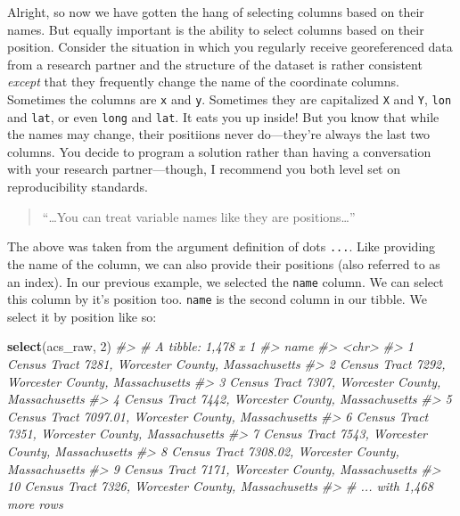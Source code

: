 \documentclass[
]{book}
\newenvironment{Shaded}{\begin{snugshade}}{\end{snugshade}}
\newcommand{\CommentTok}[1]{\textcolor[rgb]{0.56,0.35,0.01}{\textit{#1}}}
\newcommand{\DecValTok}[1]{\textcolor[rgb]{0.00,0.00,0.81}{#1}}
\newcommand{\KeywordTok}[1]{\textcolor[rgb]{0.13,0.29,0.53}{\textbf{#1}}}
\newcommand{\NormalTok}[1]{#1}
\begin{document}
Alright, so now we have gotten the hang of selecting columns based on their names. But equally important is the ability to select columns based on their position. Consider the situation in which you regularly receive georeferenced data from a research partner and the structure of the dataset is rather consistent \emph{except} that they frequently change the name of the coordinate columns. Sometimes the columns are \texttt{x} and \texttt{y}. Sometimes they are capitalized \texttt{X} and \texttt{Y}, \texttt{lon} and \texttt{lat}, or even \texttt{long} and \texttt{lat}. It eats you up inside! But you know that while the names may change, their positiions never do---they're always the last two columns. You decide to program a solution rather than having a conversation with your research partner---though, I recommend you both level set on reproducibility standards.

\begin{quote}
``\ldots You can treat variable names like they are positions\ldots{}''
\end{quote}

The above was taken from the argument definition of dots \texttt{...}. Like providing the name of the column, we can also provide their positions (also referred to as an index). In our previous example, we selected the \texttt{name} column. We can select this column by it's position too. \texttt{name} is the second column in our tibble. We select it by position like so:

\begin{Shaded}
\begin{Highlighting}[]
\KeywordTok{select}\NormalTok{(acs\_raw, }\DecValTok{2}\NormalTok{)}
\CommentTok{\#\textgreater{} \# A tibble: 1,478 x 1}
\CommentTok{\#\textgreater{}    name                                                 }
\CommentTok{\#\textgreater{}    \textless{}chr\textgreater{}                                                }
\CommentTok{\#\textgreater{}  1 Census Tract 7281, Worcester County, Massachusetts   }
\CommentTok{\#\textgreater{}  2 Census Tract 7292, Worcester County, Massachusetts   }
\CommentTok{\#\textgreater{}  3 Census Tract 7307, Worcester County, Massachusetts   }
\CommentTok{\#\textgreater{}  4 Census Tract 7442, Worcester County, Massachusetts   }
\CommentTok{\#\textgreater{}  5 Census Tract 7097.01, Worcester County, Massachusetts}
\CommentTok{\#\textgreater{}  6 Census Tract 7351, Worcester County, Massachusetts   }
\CommentTok{\#\textgreater{}  7 Census Tract 7543, Worcester County, Massachusetts   }
\CommentTok{\#\textgreater{}  8 Census Tract 7308.02, Worcester County, Massachusetts}
\CommentTok{\#\textgreater{}  9 Census Tract 7171, Worcester County, Massachusetts   }
\CommentTok{\#\textgreater{} 10 Census Tract 7326, Worcester County, Massachusetts   }
\CommentTok{\#\textgreater{} \# ... with 1,468 more rows}
\end{Highlighting}
\end{Shaded}
\end{document}
